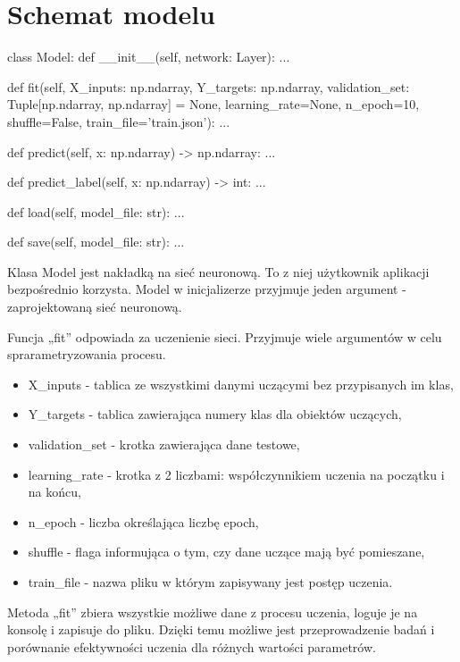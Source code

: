     \section{Schemat modelu}\label{sec:schematModelu}

    \begin{python}[caption={Schemat klasy Model}]
class Model:
    def __init__(self, network: Layer):
        ...

    def fit(self, X_inputs: np.ndarray, Y_targets: np.ndarray,
            validation_set: Tuple[np.ndarray, np.ndarray] = None,
            learning_rate=None, n_epoch=10,
            shuffle=False, train_file='train.json'):
        ...

    def predict(self, x: np.ndarray) -> np.ndarray:
        ...

    def predict_label(self, x: np.ndarray) -> int:
        ...

    def load(self, model_file: str):
        ...

    def save(self, model_file: str):
        ...
    \end{python}

    Klasa Model jest nakładką na sieć neuronową.
    To z niej użytkownik aplikacji bezpośrednio korzysta.
    Model w inicjalizerze przyjmuje jeden argument - zaprojektowaną sieć neuronową.

    Funcja „fit” odpowiada za uczenienie sieci.
    Przyjmuje wiele argumentów w celu sprarametryzowania procesu.
    \begin{itemize}
        \item X\_inputs - tablica ze wszystkimi danymi uczącymi bez przypisanych im klas,
        \item Y\_targets - tablica zawierająca numery klas dla obiektów uczących,
        \item validation\_set - krotka zawierająca dane testowe,
        \item learning\_rate - krotka z 2 liczbami: współczynnikiem uczenia na początku i na końcu,
        \item n\_epoch - liczba określająca liczbę epoch,
        \item shuffle - flaga informująca o tym, czy dane uczące mają być pomieszane,
        \item train\_file - nazwa pliku w którym zapisywany jest postęp uczenia.
    \end{itemize}

    Metoda „fit” zbiera wszystkie możliwe dane z procesu uczenia, loguje je na konsolę i zapisuje do pliku.
    Dzięki temu możliwe jest przeprowadzenie badań i porównanie efektywności uczenia dla różnych wartości parametrów.


